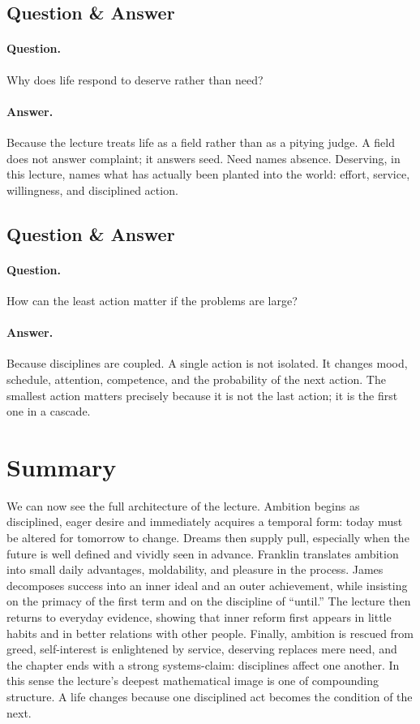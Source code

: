 \subsection{Question \& Answer}

\paragraph{Question.} Why does life respond to deserve rather than need?

\paragraph{Answer.} Because the lecture treats life as a field rather than as a pitying judge. A field does not answer complaint; it answers seed. Need names absence. Deserving, in this lecture, names what has actually been planted into the world: effort, service, willingness, and disciplined action.

\subsection{Question \& Answer}

\paragraph{Question.} How can the least action matter if the problems are large?

\paragraph{Answer.} Because disciplines are coupled. A single action is not isolated. It changes mood, schedule, attention, competence, and the probability of the next action. The smallest action matters precisely because it is not the last action; it is the first one in a cascade.

\section{Summary}

We can now see the full architecture of the lecture. Ambition begins as disciplined, eager desire and immediately acquires a temporal form: today must be altered for tomorrow to change. Dreams then supply pull, especially when the future is well defined and vividly seen in advance. Franklin translates ambition into small daily advantages, moldability, and pleasure in the process. James decomposes success into an inner ideal and an outer achievement, while insisting on the primacy of the first term and on the discipline of ``until.'' The lecture then returns to everyday evidence, showing that inner reform first appears in little habits and in better relations with other people. Finally, ambition is rescued from greed, self-interest is enlightened by service, deserving replaces mere need, and the chapter ends with a strong systems-claim: disciplines affect one another. In this sense the lecture's deepest mathematical image is one of compounding structure. A life changes because one disciplined act becomes the condition of the next.